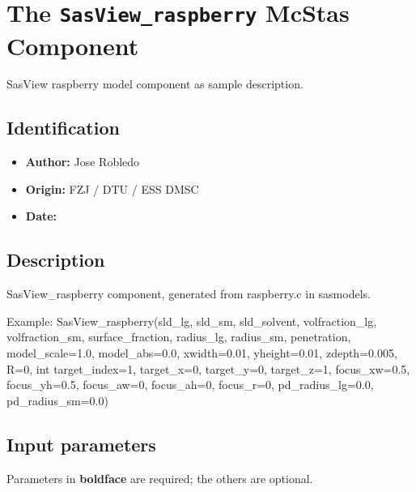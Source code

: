 \section{The \texttt{SasView\_raspberry} McStas Component}
SasView raspberry model component as sample description.

\subsection*{Identification}
\begin{itemize}
  \item \textbf{Author:} Jose Robledo
  \item \textbf{Origin:} FZJ / DTU / ESS DMSC
  \item \textbf{Date:} 
\end{itemize}

\subsection*{Description}
SasView\_raspberry component, generated from raspberry.c in sasmodels.

Example: SasView\_raspberry(sld\_lg, sld\_sm, sld\_solvent, volfraction\_lg, volfraction\_sm, surface\_fraction, radius\_lg, radius\_sm, penetration, model\_scale=1.0, model\_abs=0.0, xwidth=0.01, yheight=0.01, zdepth=0.005, R=0, int target\_index=1, target\_x=0, target\_y=0, target\_z=1, focus\_xw=0.5, focus\_yh=0.5, focus\_aw=0, focus\_ah=0, focus\_r=0, pd\_radius\_lg=0.0, pd\_radius\_sm=0.0)

\subsection*{Input parameters}
Parameters in \textbf{boldface} are required; the others are optional.

